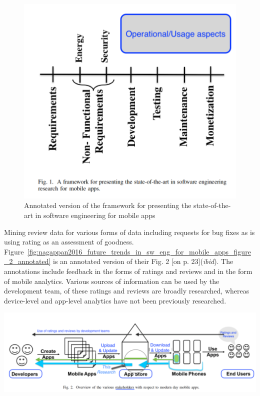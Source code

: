 \begin{figure}
    \centering
    \includegraphics[width=\linewidth]{images/related-work/future-trends-in-sweng-for-mobile-apps-fig-1-annotated.pdf}
    \caption{Annotated version of the framework for presenting the state-of-the-art in software engineering for mobile apps~\cite{nagappan2016_future_trends_in_sw_eng_for_mobile_apps}}
    \label{fig:nagappan2016_future_trends_in_sw_eng_for_mobile_apps_figure_1_annotated}
\end{figure}


Mining review data for various forms of data including requests for bug fixes as is using rating as an assessment of goodness. 
Figure~\ref{fig:nagappan2016_future_trends_in_sw_eng_for_mobile_apps_figure_2_annotated} is an annotated version of their Fig. 2 [on p. 23](\textit{ibid}). The annotations include feedback in the forms of ratings and reviews and in the form of mobile analytics. Various sources of information can be used by the development team, of these ratings and reviews are broadly researched, whereas device-level and app-level analytics have not been previously researched.


    {\centering
    \includegraphics[width=\linewidth]{images/related-work/future-trends-in-sweng-for-mobile-apps-fig-2-annotated-with-highlights.pdf}
    \label{fig:nagappan2016_future_trends_in_sw_eng_for_mobile_apps_figure_2_annotated}
    }
  
